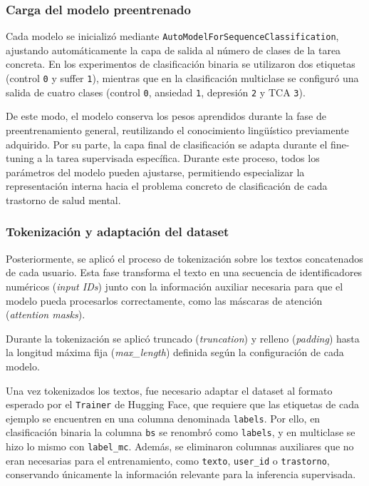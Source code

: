 \subsubsection{Carga del modelo preentrenado}

Cada modelo se inicializó mediante \texttt{AutoModelForSequenceClassification}, ajustando automáticamente la capa de salida al número de clases de la tarea concreta. En los experimentos de clasificación binaria se utilizaron dos etiquetas (control \texttt{0} y suffer \texttt{1}), mientras que en la clasificación multiclase se configuró una salida de cuatro clases (control \texttt{0}, ansiedad \texttt{1}, depresión \texttt{2} y \ac{TCA} \texttt{3}).

De este modo, el modelo conserva los pesos aprendidos durante la fase de preentrenamiento general, reutilizando el conocimiento lingüístico previamente adquirido. Por su parte, la capa final de clasificación se adapta durante el fine-tuning a la tarea supervisada específica. Durante este proceso, todos los parámetros del modelo pueden ajustarse, permitiendo especializar la representación interna hacia el problema concreto de clasificación de cada trastorno de salud mental.

\subsubsection{Tokenización y adaptación del dataset}

Posteriormente, se aplicó el proceso de tokenización sobre los textos concatenados de cada usuario. Esta fase transforma el texto en una secuencia de identificadores numéricos (\textit{input IDs}) junto con la información auxiliar necesaria para que el modelo pueda procesarlos correctamente, como las máscaras de atención (\textit{attention masks}).

Durante la tokenización se aplicó truncado (\textit{truncation}) y relleno (\textit{padding}) hasta la longitud máxima fija (\textit{max\_length}) definida según la configuración de cada modelo.

Una vez tokenizados los textos, fue necesario adaptar el dataset al formato esperado por el \texttt{Trainer} de Hugging Face, que requiere que las etiquetas de cada ejemplo se encuentren en una columna denominada \texttt{labels}. Por ello, en clasificación binaria la columna \texttt{bs} se renombró como \texttt{labels}, y en multiclase se hizo lo mismo con \texttt{label\_mc}. Además, se eliminaron columnas auxiliares que no eran necesarias para el entrenamiento, como \texttt{texto}, \texttt{user\_id} o \texttt{trastorno}, conservando únicamente la información relevante para la inferencia supervisada.

